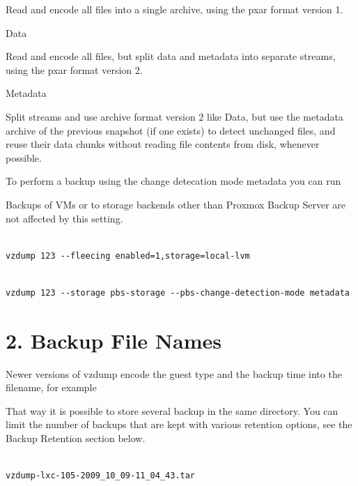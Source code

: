 Read and encode all files into a single archive, using the pxar format version 1.

Data

Read and encode all files, but split data and metadata into separate streams, using the pxar format version 2.

Metadata

Split streams and use archive format version 2 like Data, but use the metadata archive of the previous snapshot (if one exists) to detect unchanged files, and reuse their data chunks without reading file contents from disk, whenever possible.

To perform a backup using the change detecation mode metadata you can run

Backups of VMs or to storage backends other than Proxmox Backup Server are not affected by this setting.

\begin{lstlisting}

vzdump 123 --fleecing enabled=1,storage=local-lvm

\end{lstlisting}

\begin{lstlisting}

vzdump 123 --storage pbs-storage --pbs-change-detection-mode metadata

\end{lstlisting}

\begin{table}[htbp]

\centering

\begin{tabular}

\end{tabular}

\end{table}


\section{2. Backup File Names}

Newer versions of vzdump encode the guest type and the backup time into the filename, for example

That way it is possible to store several backup in the same directory. You can limit the number of backups that are kept with various retention options, see the Backup Retention section below.

\begin{lstlisting}

vzdump-lxc-105-2009_10_09-11_04_43.tar

\end{lstlisting}


